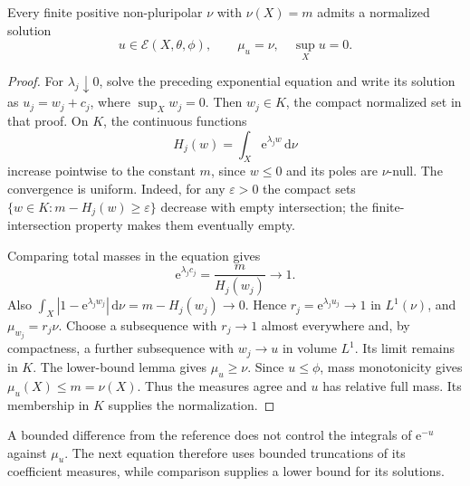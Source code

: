 \begin{theorem}\label{thm:nonpluripolar-relative-prescribed-measure-existence}
Every finite positive non-pluripolar $\nu$ with $\nu(X)=m$ admits a normalized solution
\[
 u\in\mathcal E(X,\theta,\phi),\qquad
                \mu_u=\nu,\quad\sup_Xu=0.
\]
\end{theorem}
\begin{proof}
For $\lambda_j\downarrow0$, solve the preceding exponential equation and write its solution as $u_j=w_j+c_j$, where $\sup_Xw_j=0$. Then $w_j\in K$, the compact normalized set in that proof. On $K$, the continuous functions
\[
 H_j(w)=\int_X\mathrm e^{\lambda_jw}\,\mathrm d\nu
\]
increase pointwise to the constant $m$, since $w\leq0$ and its poles are $\nu$-null. The convergence is uniform. Indeed, for any $\varepsilon>0$ the compact sets $\{w\in K:m-H_j(w)\geq\varepsilon\}$ decrease with empty intersection; the finite-intersection property makes them eventually empty.

Comparing total masses in the equation gives
\[
 \mathrm e^{\lambda_jc_j}=\frac m{H_j(w_j)}\longrightarrow1.
\]
Also $\int_X|1-\mathrm e^{\lambda_jw_j}|\,\mathrm d\nu=m-H_j(w_j)\to0$. Hence
$r_j=\mathrm e^{\lambda_ju_j}\to1$ in $L^1(\nu)$, and $\mu_{w_j}=r_j\nu$. Choose a subsequence with $r_j\to1$ almost everywhere and, by compactness, a further subsequence with $w_j\to u$ in volume $L^1$. Its limit remains in $K$. The lower-bound lemma gives $\mu_u\geq\nu$. Since $u\leq\phi$, mass monotonicity gives $\mu_u(X)\leq m=\nu(X)$. Thus the measures agree and $u$ has relative full mass. Its membership in $K$ supplies the normalization.
\end{proof}





A bounded difference from the reference does not control the integrals of $\mathrm e^{-u}$ against $\mu_u$. The next equation therefore uses bounded truncations of its coefficient measures, while comparison supplies a lower bound for its solutions.

